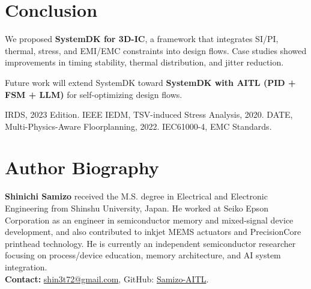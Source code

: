 \documentclass[conference]{IEEEtran}
\begin{document}
\section{Conclusion}
We proposed \textbf{SystemDK for 3D-IC}, a framework that integrates SI/PI, thermal, stress, and EMI/EMC constraints into design flows.
Case studies showed improvements in timing stability, thermal distribution, and jitter reduction.

Future work will extend SystemDK toward \textbf{SystemDK with AITL (PID + FSM + LLM)} for self-optimizing design flows.

\begin{thebibliography}{1}
 IRDS, 2023 Edition.
 IEEE IEDM, TSV-induced Stress Analysis, 2020.
 DATE, Multi-Physics-Aware Floorplanning, 2022.
 IEC61000-4, EMC Standards.
\end{thebibliography}

\section*{Author Biography}
\noindent\textbf{Shinichi Samizo}
received the M.S. degree in Electrical and Electronic Engineering from Shinshu University, Japan.
He worked at Seiko Epson Corporation as an engineer in semiconductor memory and mixed-signal device development, and also contributed to inkjet MEMS actuators and PrecisionCore printhead technology.
He is currently an independent semiconductor researcher focusing on process/device education, memory architecture, and AI system integration.\\
\textbf{Contact:} \href{mailto:shin3t72@gmail.com}{shin3t72@gmail.com}, GitHub: \href{https://github.com/Samizo-AITL}{Samizo-AITL}.
\end{document}
